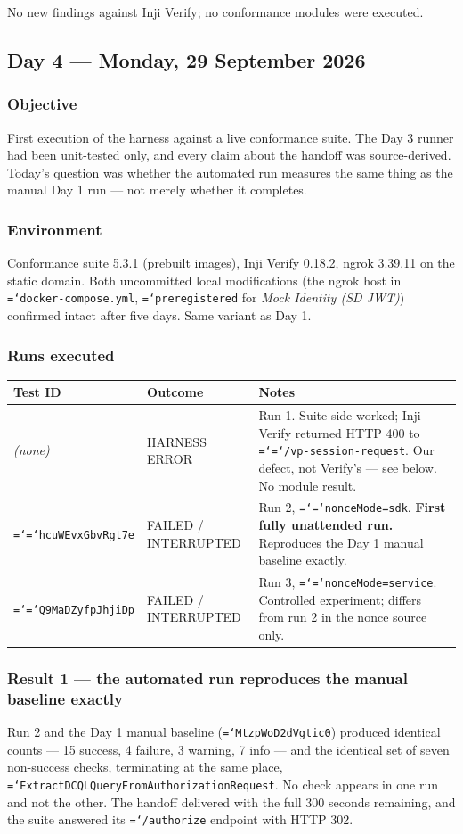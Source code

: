 \documentclass[11pt,a4paper]{article}
\let\origtexttt\texttt
\renewcommand{\texttt}[1]{\origtexttt{\hyphenchar\font=`\-\relax #1}}
\renewcommand{\_}{\textunderscore\allowbreak}
\begin{document}
No new findings against Inji Verify; no conformance modules were executed.

\subsection{Day 4 --- Monday, 29 September 2026}

\subsubsection*{Objective}
First execution of the harness against a live conformance suite. The Day 3 runner had been
unit-tested only, and every claim about the handoff was source-derived. Today's question was
whether the automated run measures the same thing as the manual Day 1 run --- not merely
whether it completes.

\subsubsection*{Environment}
Conformance suite 5.3.1 (prebuilt images), Inji Verify 0.18.2, ngrok 3.39.11 on the static
domain. Both uncommitted local modifications (the ngrok host in \texttt{docker-compose.yml},
\texttt{pre\_registered} for \emph{Mock Identity (SD JWT)}) confirmed intact after five days.
Same variant as Day 1.

\subsubsection*{Runs executed}
\begin{longtable}{p{2.6cm} p{2.4cm} p{9.2cm}}
\hline
\textbf{Test ID} & \textbf{Outcome} & \textbf{Notes}\\
\hline
\endhead
\emph{(none)} & HARNESS ERROR & Run 1. Suite side worked; Inji Verify returned HTTP 400 to
\texttt{/vp-session-request}. Our defect, not Verify's --- see below. No module result.\\
\texttt{hcuWEvxGbvRgt7e} & FAILED / INTERRUPTED & Run 2, \texttt{nonceMode=sdk}. \textbf{First
fully unattended run.} Reproduces the Day 1 manual baseline exactly.\\
\texttt{Q9MaDZyfpJhjiDp} & FAILED / INTERRUPTED & Run 3, \texttt{nonceMode=service}. Controlled
experiment; differs from run 2 in the nonce source only.\\
\hline
\end{longtable}

\subsubsection*{Result 1 --- the automated run reproduces the manual baseline exactly}
Run 2 and the Day 1 manual baseline (\texttt{MtzpWoD2dVgtic0}) produced identical counts
--- 15 success, 4 failure, 3 warning, 7 info --- and the identical set of seven non-success
checks, terminating at the same place, \texttt{ExtractDCQLQueryFromAuthorizationRequest}. No
check appears in one run and not the other. The handoff delivered with the full 300 seconds
remaining, and the suite answered its \texttt{/authorize} endpoint with HTTP 302.
\end{document}
